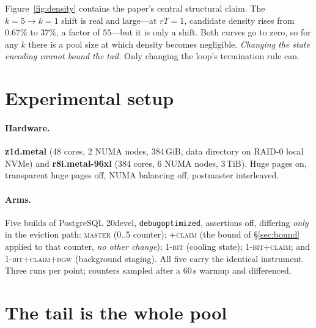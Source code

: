 \documentclass[sigconf,nonacm]{acmart}
\begin{document}
Figure~\ref{fig:density} contains the paper's central structural claim. The
$k=5 \rightarrow k=1$ shift is real and large---at $rT=1$, candidate density
rises from $0.67\%$ to $37\%$, a factor of $55$---but it is only a shift. Both
curves go to zero, so for any $k$ there is a pool size at which density becomes
negligible. \emph{Changing the state encoding cannot bound the tail.} Only
changing the loop's termination rule can.

\section{Experimental setup}

\paragraph{Hardware.} \textbf{z1d.metal} (48 cores, 2 NUMA nodes, 384\,GiB,
data directory on RAID-0 local NVMe) and \textbf{r8i.metal-96xl} (384 cores, 6
NUMA nodes, 3\,TiB). Huge pages on, transparent huge pages off, NUMA balancing
off, postmaster interleaved.

\paragraph{Arms.} Five builds of PostgreSQL 20devel,
\texttt{debugoptimized}, assertions off, differing \emph{only} in the eviction
path: \textsc{master} (0..5 counter); \textsc{+claim} (the bound of
\S\ref{sec:bound} applied to that counter, \emph{no other change});
\textsc{1-bit} (cooling state); \textsc{1-bit+claim}; and
\textsc{1-bit+claim+bgw} (background staging). All five carry the identical
instrument. Three runs per point; counters sampled after a 60\,s warmup and
differenced.

\section{The tail is the whole pool}
\label{sec:tail}
\end{document}
